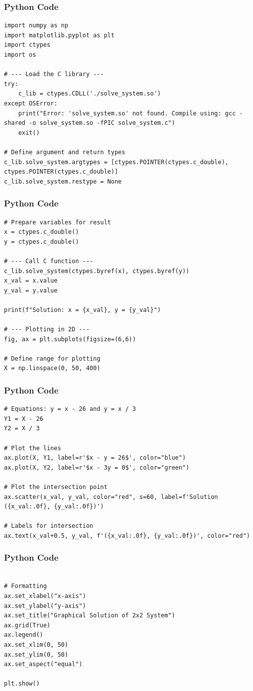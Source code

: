\documentclass{beamer}
\begin{document}
\begin{frame}[fragile]
    \frametitle{Python Code}
    \begin{lstlisting}
import numpy as np
import matplotlib.pyplot as plt
import ctypes
import os

# --- Load the C library ---
try:
    c_lib = ctypes.CDLL('./solve_system.so')
except OSError:
    print("Error: 'solve_system.so' not found. Compile using: gcc -shared -o solve_system.so -fPIC solve_system.c")
    exit()

# Define argument and return types
c_lib.solve_system.argtypes = [ctypes.POINTER(ctypes.c_double), ctypes.POINTER(ctypes.c_double)]
c_lib.solve_system.restype = None
    \end{lstlisting}
\end{frame}

\begin{frame}[fragile]
    \frametitle{Python Code}
    \begin{lstlisting}
# Prepare variables for result
x = ctypes.c_double()
y = ctypes.c_double()

# --- Call C function ---
c_lib.solve_system(ctypes.byref(x), ctypes.byref(y))
x_val = x.value
y_val = y.value

print(f"Solution: x = {x_val}, y = {y_val}")

# --- Plotting in 2D ---
fig, ax = plt.subplots(figsize=(6,6))

# Define range for plotting
X = np.linspace(0, 50, 400)
    \end{lstlisting}
\end{frame}

\begin{frame}[fragile]
    \frametitle{Python Code}
    \begin{lstlisting}
# Equations: y = x - 26 and y = x / 3
Y1 = X - 26
Y2 = X / 3

# Plot the lines
ax.plot(X, Y1, label=r'$x - y = 26$', color="blue")
ax.plot(X, Y2, label=r'$x - 3y = 0$', color="green")

# Plot the intersection point
ax.scatter(x_val, y_val, color="red", s=60, label=f'Solution ({x_val:.0f}, {y_val:.0f})')

# Labels for intersection
ax.text(x_val+0.5, y_val, f'({x_val:.0f}, {y_val:.0f})', color="red")
    \end{lstlisting}
\end{frame}

\begin{frame}[fragile]
    \frametitle{Python Code}
    \begin{lstlisting}

# Formatting
ax.set_xlabel("x-axis")
ax.set_ylabel("y-axis")
ax.set_title("Graphical Solution of 2x2 System")
ax.grid(True)
ax.legend()
ax.set_xlim(0, 50)
ax.set_ylim(0, 50)
ax.set_aspect("equal")

plt.show()

    \end{lstlisting}
\end{frame}
\end{document}
